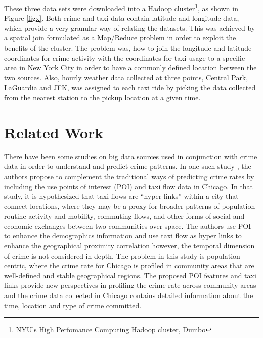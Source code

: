 \documentclass{sigkddExp}
\begin{document}

These three data sets were downloaded into a Hadoop cluster\footnote{NYU's High Perfomance Computing Hadoop cluster, Dumbo}, as shown in Figure \ref{figx}. Both crime and taxi data contain latitude and longitude data, which provide a very granular way of relating the datasets. 
This was achieved by a spatial join formulated as a Map/Reduce problem in order to exploit the benefits of the cluster. 
The problem was, how to join the  longitude and latitude coordinates for crime activity with the coordinates for taxi usage to a specific area  in New York City   in order to have a commonly defined location between the two sources.
Also, hourly weather data collected at three points, Central Park, LaGuardia and JFK, was assigned to each taxi ride by picking the data collected from the nearest station to the pickup location at a given time. 





\section{Related Work}

There have been some studies on big data sources used in conjunction with crime data in order to understand and predict crime patterns. 
In one such study \cite{Wang16}, the authors propose to complement the traditional ways of predicting crime rates by including the use points of interest (POI) and taxi flow data in Chicago. 
In that study, it is hypothesized that taxi flows are ``hyper links'' within a city that connect locations, where they may be a proxy for broader patterns of population routine activity and mobility, commuting flows, and other forms of social and economic exchanges between two communities over space. The authors use POI to enhance the demographics information and use taxi flow as hyper links to enhance the geographical proximity correlation however, the temporal dimension of crime is not considered in depth. The problem in this study is population-centric, where the crime rate for Chicago is profiled in community areas that are well-defined and stable geographical regions. The proposed POI features and taxi links provide new perspectives in profiling the crime rate across community areas and the crime data collected in Chicago contains detailed information about the time, location and type of crime committed.
\end{document}
